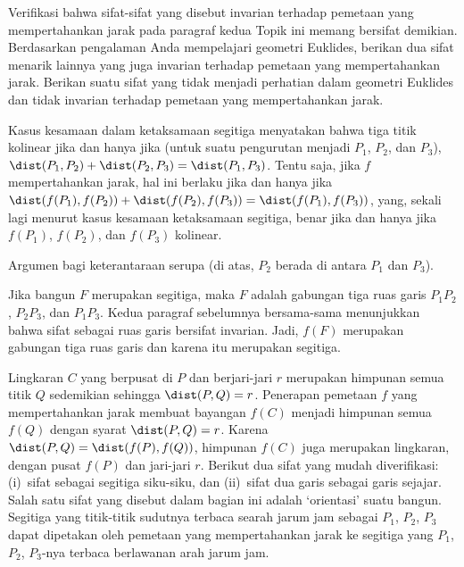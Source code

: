 \begin{exercises}
  \item \label{exer:GeomInvDistPre}
    \begin{exparts}
     \partsitem Verifikasi bahwa sifat-sifat yang disebut invarian terhadap
       pemetaan yang mempertahankan jarak pada paragraf kedua Topik ini memang
       bersifat demikian.
     \partsitem Berdasarkan pengalaman Anda mempelajari geometri Euklides,
       berikan dua sifat menarik lainnya yang juga invarian terhadap pemetaan
       yang mempertahankan jarak.
     \partsitem Berikan suatu sifat yang tidak menjadi perhatian dalam
       geometri Euklides dan tidak invarian terhadap pemetaan yang
       mempertahankan jarak.
    \end{exparts}
    \begin{answer}
      \begin{exparts}
        \partsitem Kasus kesamaan dalam ketaksamaan segitiga menyatakan bahwa
          tiga titik kolinear jika
          dan hanya jika (untuk suatu pengurutan menjadi $P_1$, $P_2$, dan
          $P_3$),
          $\dist(P_1,P_2)+\dist(P_2,P_3)=\dist(P_1,P_3)$.
          Tentu saja, jika $f$ mempertahankan jarak, hal ini berlaku jika dan
          hanya jika
          $\dist(f(P_1),f(P_2))+\dist(f(P_2),f(P_3))=\dist(f(P_1),f(P_3))$,
          yang, sekali lagi menurut kasus kesamaan ketaksamaan segitiga, benar
          jika dan hanya jika
          $f(P_1)$, $f(P_2)$, dan $f(P_3)$ kolinear.
        
          Argumen bagi keterantaraan serupa (di atas, $P_2$ berada di antara
          $P_1$ dan $P_3$).

          Jika bangun $F$ merupakan segitiga, maka $F$ adalah gabungan tiga
          ruas garis $P_1P_2$, $P_2P_3$, dan $P_1P_3$.
          Kedua paragraf sebelumnya bersama-sama menunjukkan bahwa sifat
          sebagai ruas garis bersifat invarian.
          Jadi, $f(F)$ merupakan gabungan tiga ruas garis dan karena itu
          merupakan segitiga.

          Lingkaran $C$ yang berpusat di $P$ dan berjari-jari $r$ merupakan
          himpunan semua titik $Q$ sedemikian sehingga $\dist(P,Q)=r$.
          Penerapan pemetaan $f$ yang mempertahankan jarak membuat bayangan
          $f(C)$ menjadi himpunan semua $f(Q)$ dengan syarat
          $\dist(P,Q)=r$. Karena $\dist(P,Q)=\dist(f(P),f(Q))$, himpunan
          $f(C)$ juga merupakan lingkaran, dengan pusat $f(P)$ dan jari-jari
          $r$.
        \partsitem Berikut dua sifat yang mudah diverifikasi: (i)~sifat sebagai
          segitiga siku-siku, dan (ii)~sifat dua garis sebagai garis sejajar.
        \partsitem Salah satu sifat yang disebut dalam bagian ini adalah
          `orientasi' suatu bangun.
          Segitiga yang titik-titik sudutnya terbaca searah jarum jam sebagai
          $P_1$, $P_2$, $P_3$ dapat dipetakan oleh pemetaan yang mempertahankan
          jarak ke segitiga yang $P_1$, $P_2$, $P_3$-nya terbaca berlawanan
          arah jarum jam.
      \end{exparts}
    \end{answer}
\end{exercises}
\endinput
